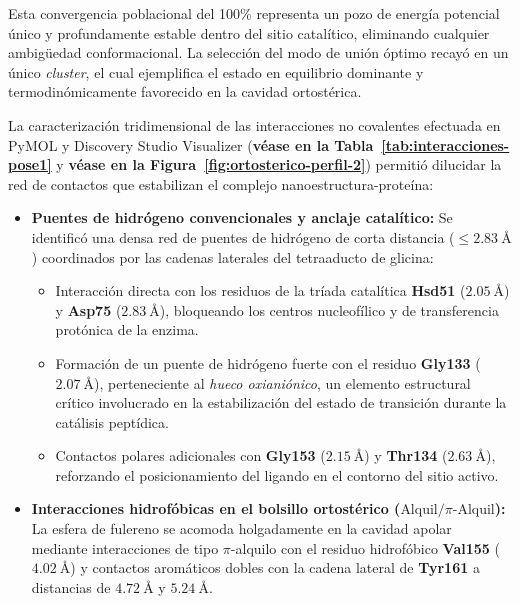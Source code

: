 \begin{table}[htbp]
Esta convergencia poblacional del 100\% representa un pozo de energía potencial único y profundamente estable dentro del sitio catalítico, eliminando cualquier ambigüedad conformacional. La selección del modo de unión óptimo recayó en un único \textit{cluster}, el cual ejemplifica el estado en equilibrio dominante y termodinómicamente favorecido en la cavidad ortostérica.


La caracterización tridimensional de las interacciones no covalentes efectuada en PyMOL y Discovery Studio Visualizer (\textbf{véase en la Tabla~\ref{tab:interacciones-pose1}} y \textbf{véase en la Figura~\ref{fig:ortosterico-perfil-2}}) permitió dilucidar la red de contactos que estabilizan el complejo nanoestructura-proteína:

\begin{itemize}
    \item \textbf{Puentes de hidrógeno convencionales y anclaje catalítico:} Se identificó una densa red de puentes de hidrógeno de corta distancia ($\le 2.83\ \text{\AA}$) coordinados por las cadenas laterales del tetraaducto de glicina:
    \begin{itemize}
        \item Interacción directa con los residuos de la tríada catalítica \textbf{Hsd51} ($2.05\ \text{\AA}$) y \textbf{Asp75} ($2.83\ \text{\AA}$), bloqueando los centros nucleofílico y de transferencia protónica de la enzima.
        \item Formación de un puente de hidrógeno fuerte con el residuo \textbf{Gly133} ($2.07\ \text{\AA}$), perteneciente al \textit{hueco oxianiónico}, un elemento estructural crítico involucrado en la estabilización del estado de transición durante la catálisis peptídica.
        \item Contactos polares adicionales con \textbf{Gly153} ($2.15\ \text{\AA}$) y \textbf{Thr134} ($2.63\ \text{\AA}$), reforzando el posicionamiento del ligando en el contorno del sitio activo.
    \end{itemize}
    
    \item \textbf{Interacciones hidrofóbicas en el bolsillo ortostérico ($\text{Alquil} / \pi\text{-Alquil}$):} La esfera de fulereno se acomoda holgadamente en la cavidad apolar mediante interacciones de tipo $\pi$-alquilo con el residuo hidrofóbico \textbf{Val155} ($4.02\ \text{\AA}$) y contactos aromáticos dobles con la cadena lateral de \textbf{Tyr161} a distancias de $4.72\ \text{\AA}$ y $5.24\ \text{\AA}$.
\end{itemize}


\end{table}
